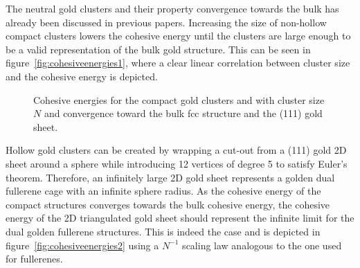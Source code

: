 The neutral gold clusters and their property convergence towards the bulk has
already been discussed in previous
papers.\autocite{Assadollahzadeh_systematicsearchminimum_2009} Increasing the
size of non-hollow compact clusters lowers the cohesive energy until the
clusters are large enough to be a valid representation of the bulk gold
structure. This can be seen in figure~\ref{fig:cohesiveenergies1}, where a
clear linear correlation between cluster size and the cohesive energy is
depicted.
%
\begin{figure}[htb]\centering
    \hfill
	\caption{Cohesive energies for \protect{} the compact gold clusters and \protect{} with cluster size $N$ and \protect{} convergence toward the bulk \acs{fcc} structure and \protect{} the (111) gold sheet.}
\end{figure}
%
Hollow gold clusters can be created by wrapping a cut-out from a (111) gold 2D
sheet around a sphere while introducing 12 vertices of degree 5 to satisfy
Euler's theorem. Therefore, an infinitely large 2D gold sheet represents a
golden dual fullerene cage with an infinite sphere radius. As the cohesive
energy of the compact structures converges towards the bulk cohesive energy, the
cohesive energy of the 2D triangulated gold sheet should represent the infinite limit for the
dual golden fullerene structures. This is indeed the case and is depicted in
figure~\ref{fig:cohesiveenergies2} using a $N^{-1}$ scaling law analogous to the
one used for fullerenes.\autocite{Wirz_smallfullerenesgraphene_2015}

